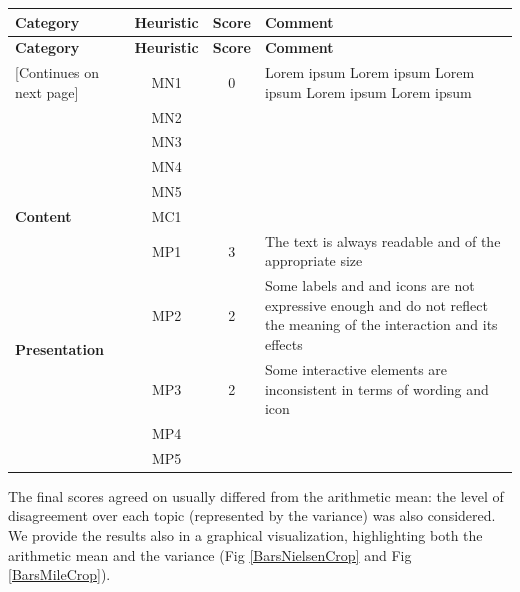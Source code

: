 \begin{tabularx}{\linewidth}{l c c X}
\toprule
\textbf{Category} & \textbf{Heuristic} & \textbf{Score} & \textbf{Comment} \\
\midrule
\endfirsthead
\toprule
\textbf{Category} & \textbf{Heuristic} & \textbf{Score} & \textbf{Comment} \\
\midrule
\endhead
\midrule
\footnotesize [Continues on next page]
\endfoot
\bottomrule
\endlastfoot

\multirow{5}{*}{\textbf{Navigation}}   & MN1 & 0 & Lorem ipsum Lorem ipsum Lorem ipsum Lorem ipsum Lorem ipsum \\ \cmidrule{2-4} 
                                        & MN2 &  &  \\ \cmidrule{2-4} 
                                        & MN3 &  &  \\ \cmidrule{2-4} 
                                        & MN4 &  &  \\ \cmidrule{2-4} 
                                        & MN5 &  &  \\ \midrule
\textbf{Content}                       & MC1 &  &  \\ \midrule
\multirow{5}{*}{\textbf{Presentation}} & MP1 & 3 & The text is always readable and of the appropriate size \\ \cmidrule{2-4} 
                                        & MP2 & 2 & Some labels and and icons are not expressive enough and do not reflect the meaning of the interaction and its effects\\ \cmidrule{2-4} 
                                        & MP3 & 2 & Some interactive elements are inconsistent in terms of wording and icon\\ \cmidrule{2-4} 
                                        & MP4 &  &  \\ \cmidrule{2-4} 
                                        & MP5 &  &
\end{tabularx}

\pagebreak

The final scores agreed on usually differed from the arithmetic mean: the level of disagreement over each topic (represented by the variance) was also considered.\\
We provide the results also in a graphical visualization, highlighting both the arithmetic mean and the variance (Fig \ref{BarsNielsenCrop} and Fig \ref{BarsMileCrop}).

